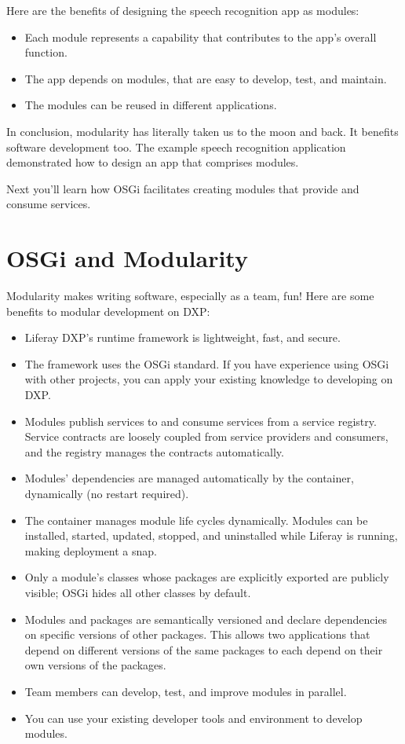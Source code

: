 Here are the benefits of designing the speech recognition app as
modules:

\begin{itemize}
\tightlist
\item
  Each module represents a capability that contributes to the app's
  overall function.
\item
  The app depends on modules, that are easy to develop, test, and
  maintain.
\item
  The modules can be reused in different applications.
\end{itemize}

In conclusion, modularity has literally taken us to the moon and back.
It benefits software development too. The example speech recognition
application demonstrated how to design an app that comprises modules.

Next you'll learn how OSGi facilitates creating modules that provide and
consume services.

\chapter{OSGi and Modularity}\label{osgi-and-modularity}

Modularity makes writing software, especially as a team, fun! Here are
some benefits to modular development on DXP:

\begin{itemize}
\tightlist
\item
  Liferay DXP's runtime framework is lightweight, fast, and secure.
\item
  The framework uses the OSGi standard. If you have experience using
  OSGi with other projects, you can apply your existing knowledge to
  developing on DXP.
\item
  Modules publish services to and consume services from a service
  registry. Service contracts are loosely coupled from service providers
  and consumers, and the registry manages the contracts automatically.
\item
  Modules' dependencies are managed automatically by the container,
  dynamically (no restart required).
\item
  The container manages module life cycles dynamically. Modules can be
  installed, started, updated, stopped, and uninstalled while Liferay is
  running, making deployment a snap.
\item
  Only a module's classes whose packages are explicitly exported are
  publicly visible; OSGi hides all other classes by default.
\item
  Modules and packages are semantically versioned and declare
  dependencies on specific versions of other packages. This allows two
  applications that depend on different versions of the same packages to
  each depend on their own versions of the packages.
\item
  Team members can develop, test, and improve modules in parallel.
\item
  You can use your existing developer tools and environment to develop
  modules.
\end{itemize}

